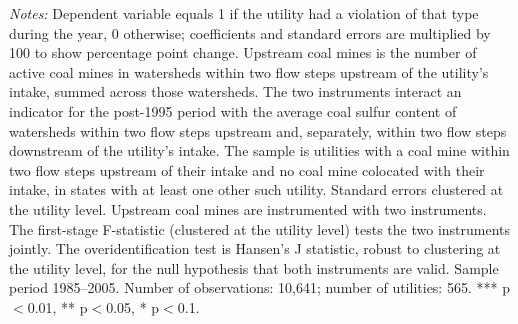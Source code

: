 \begin{table}[htbp]
\begin{minipage}{\linewidth}
\textit{Notes:} Dependent variable equals 1 if the utility had a violation of that type during the year, 0 otherwise; coefficients and standard errors are multiplied by 100 to show percentage point change. Upstream coal mines is the number of active coal mines in watersheds within two flow steps upstream of the utility's intake, summed across those watersheds. The two instruments interact an indicator for the post-1995 period with the average coal sulfur content of watersheds within two flow steps upstream and, separately, within two flow steps downstream of the utility's intake. The sample is utilities with a coal mine within two flow steps upstream of their intake and no coal mine colocated with their intake, in states with at least one other such utility. Standard errors clustered at the utility level. Upstream coal mines are instrumented with two instruments. The first-stage F-statistic (clustered at the utility level) tests the two instruments jointly. The overidentification test is Hansen's J statistic, robust to clustering at the utility level, for the null hypothesis that both instruments are valid. Sample period 1985--2005. Number of observations: 10,641; number of utilities: 565. *** p$<$0.01, ** p$<$0.05, * p$<$0.1.
\end{minipage}
\end{table}
